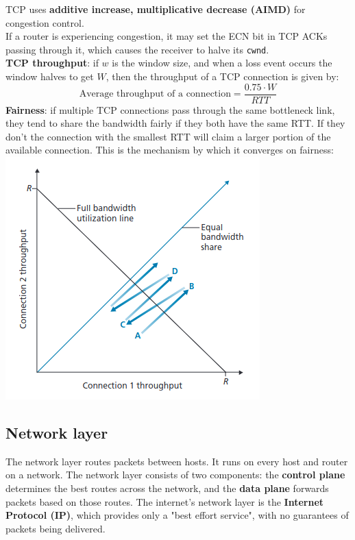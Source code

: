 TCP uses \textbf{additive increase, multiplicative decrease (AIMD)} for congestion control.\\
If a router is experiencing congestion, it may set the ECN bit in TCP ACKs passing through it, which causes the receiver to halve its \verb|cwnd|.\\
\textbf{TCP throughput}: if $w$ is the window size, and when a loss event occurs the window halves to get $W$, then the throughput of a TCP connection is given by:
\[
	\text{Average throughput of a connection}=\frac{0.75\cdot W}{RTT}
\]
\textbf{Fairness}: if multiple TCP connections pass through the same bottleneck link, they tend to share the bandwidth fairly if they both have the same RTT. If they don't the connection with the smallest RTT will claim a larger portion of the available connection. This is the mechanism by which it converges on fairness:
\includegraphics[width=\linewidth]{../images/w5n4tcpFairness.png}\\

\subsection{Network layer}
The network layer routes packets between hosts. It runs on every host and router on a network. The network layer consists of two components: the \textbf{control plane} determines the best routes across the network, and the \textbf{data plane} forwards packets based on those routes. The internet's network layer is the \textbf{Internet Protocol (IP)}, which provides only a "best effort service", with no guarantees of packets being delivered.\\

